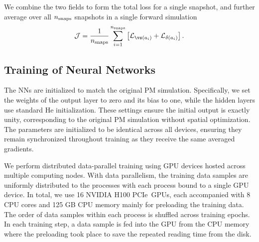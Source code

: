 \documentclass[modern, trackchanges, dvipsnames]{aastex631}
\renewcommand{\d}{d}
\newcommand{\cJ}{\mathcal{J}}
\newcommand{\cL}{\mathcal{L}}
\newcommand{\GPU}{NVIDIA H100 PCIe}  %
\begin{document}

We combine the two fields to form the total loss for a single snapshot,
and further average over all $n_{\rm snaps}$ snapshots in a single forward simulation
%
\begin{equation}
\cJ = \frac{1}{n_{\rm snaps}} \sum_{i=1}^{n_{\rm snaps}} \left[
                      \cL_{\vs(a_i)} + \cL_{\delta(a_i)}\right].
\end{equation}
%


\vspace{1em}
\subsection{Training of Neural Networks}
\label{sec:training}

The NNs are initialized to match the original PM simulation.
Specifically, we set the weights of the output layer to zero and its bias
to one, while the hidden layers use standard He initialization.
These settings ensure the initial output is exactly unity, corresponding
to the original PM simulation without spatial optimization.
The parameters are initialized to be identical across all devices, ensuring they
remain synchronized throughout training as they receive the same averaged
gradients.

We perform distributed data-parallel training using GPU devices hosted
across multiple computing nodes.
With data parallelism, the training data samples are uniformly
distributed to the processes with each process bound to a single GPU
device.
In total, we use 16 \GPU\ GPUs, each accompanied with 8 CPU cores
and 125 GB CPU memory mainly for preloading the training data.
The order of data samples within each process is shuffled across
training epochs.
In each training step, a data sample is fed into the GPU from the CPU
memory where the preloading took place to save the repeated reading time
from the disk.
\end{document}
